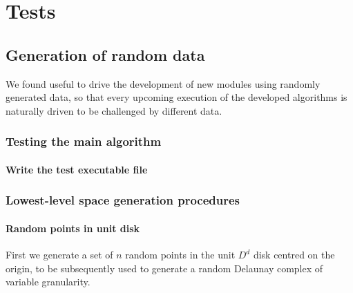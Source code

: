 \documentclass[11pt,oneside]{article}	%
\begin{document}
\section{Tests}
\subsection{Generation of random data}

We found useful to drive the development of new modules using randomly generated data, so that every upcoming execution of the developed algorithms is naturally driven to be challenged by different data.

\subsubsection{Testing the main algorithm}

\paragraph{Write the test executable file}




\subsubsection{Lowest-level space generation procedures}

\paragraph{Random points in unit disk} 
First we generate a  set of $n$ random points in the unit $D^d$ disk centred on the origin, to be subsequently used to generate a random Delaunay complex of variable granularity.
\end{document}

